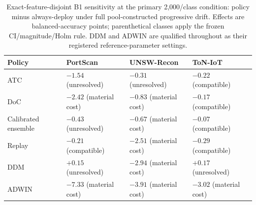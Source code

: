\begin{table}[t]
\centering
\caption{Exact-feature-disjoint B1 sensitivity at the primary 2{,}000/class condition:
policy minus always-deploy under full pool-constructed progressive drift. Effects are
balanced-accuracy points; parenthetical classes apply the frozen CI/magnitude/Holm rule.
DDM and ADWIN are qualified throughout as their registered reference-parameter settings.}
\label{tab:value_disjoint_b1_summary}
\scriptsize
\setlength{\tabcolsep}{3pt}
\begin{tabular}{l l l l}
\toprule
Policy & PortScan & UNSW-Recon & ToN-IoT \\
\midrule
ATC & $-1.54$ (unresolved) & $-0.31$ (unresolved) & $-0.22$ (compatible) \\
DoC & $-2.42$ (material cost) & $-0.83$ (material cost) & $-0.17$ (compatible) \\
Calibrated ensemble & $-0.43$ (unresolved) & $-0.67$ (material cost) & $-0.07$ (compatible) \\
Replay & $-0.21$ (compatible) & $-2.51$ (material cost) & $-0.29$ (compatible) \\
DDM & $+0.15$ (unresolved) & $-2.94$ (material cost) & $+0.17$ (unresolved) \\
ADWIN & $-7.33$ (material cost) & $-3.91$ (material cost) & $-3.02$ (material cost) \\
\bottomrule
\end{tabular}
\end{table}
